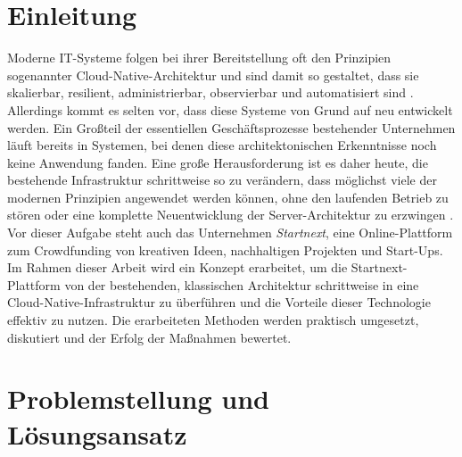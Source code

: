 \documentclass[11pt]{scrartcl}
\begin{document}
\section{Einleitung}

Moderne IT-Systeme folgen bei ihrer Bereitstellung oft den Prinzipien sogenannter Cloud-Native-Architektur und sind damit so gestaltet, dass sie skalierbar, resilient, administrierbar, observierbar und automatisiert sind \cite{Lee:2021}. 
Allerdings kommt es selten vor, dass diese Systeme von Grund auf neu entwickelt werden. Ein Großteil der essentiellen Geschäftsprozesse bestehender Unternehmen läuft bereits in Systemen, bei denen diese architektonischen Erkenntnisse noch keine Anwendung fanden. Eine große Herausforderung ist es daher heute, die bestehende Infrastruktur schrittweise so zu verändern, dass möglichst viele der modernen Prinzipien angewendet werden können, ohne den laufenden Betrieb zu stören oder eine komplette Neuentwicklung der Server-Architektur zu erzwingen \cite{Fiedelholtz:2021}.
Vor dieser Aufgabe steht auch das Unternehmen \textit{Startnext}, eine Online-Plattform zum Crowdfunding von kreativen Ideen, nachhaltigen Projekten und Start-Ups. Im Rahmen dieser Arbeit wird ein Konzept erarbeitet, um die Startnext-Plattform von der bestehenden, klassischen Architektur schrittweise in eine Cloud-Native-Infrastruktur zu überführen und die Vorteile dieser Technologie effektiv zu nutzen. Die erarbeiteten Methoden werden praktisch umgesetzt, diskutiert und der Erfolg der Maßnahmen bewertet.

\section{\label{sec:problem_loesung}Problemstellung und Lösungsansatz}
\end{document}
